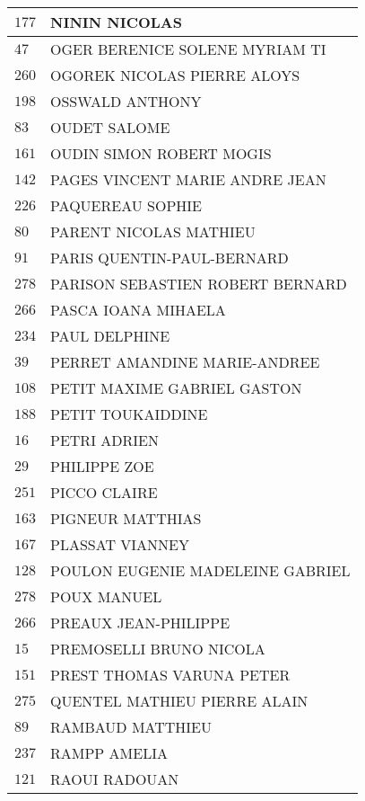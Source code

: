 \begin{xltabular}{\linewidth}{|l|X|}
    \hline
    $177$ & NININ NICOLAS \\
    \hline
    $47$ & OGER BERENICE SOLENE MYRIAM TI \\
    \hline
    $260$ & OGOREK NICOLAS PIERRE ALOYS \\
    \hline
    $198$ & OSSWALD ANTHONY \\
    \hline
    $83$ & OUDET SALOME \\
    \hline
    $161$ & OUDIN SIMON ROBERT MOGIS \\
    \hline
    $142$ & PAGES VINCENT MARIE ANDRE JEAN \\
    \hline
    $226$ & PAQUEREAU SOPHIE \\
    \hline
    $80$ & PARENT NICOLAS MATHIEU \\
    \hline
    $91$ & PARIS QUENTIN-PAUL-BERNARD \\
    \hline
    $278$ & PARISON SEBASTIEN ROBERT BERNARD \\
    \hline
    $266$ & PASCA IOANA MIHAELA \\
    \hline
    $234$ & PAUL DELPHINE \\
    \hline
    $39$ & PERRET AMANDINE MARIE-ANDREE \\
    \hline
    $108$ & PETIT MAXIME GABRIEL GASTON \\
    \hline
    $188$ & PETIT TOUKAIDDINE \\
    \hline
    $16$ & PETRI ADRIEN \\
    \hline
    $29$ & PHILIPPE ZOE \\
    \hline
    $251$ & PICCO CLAIRE \\
    \hline
    $163$ & PIGNEUR MATTHIAS \\
    \hline
    $167$ & PLASSAT VIANNEY \\
    \hline
    $128$ & POULON EUGENIE MADELEINE GABRIEL \\
    \hline
    $278$ & POUX MANUEL \\
    \hline
    $266$ & PREAUX JEAN-PHILIPPE \\
    \hline
    $15$ & PREMOSELLI BRUNO NICOLA \\
    \hline
    $151$ & PREST THOMAS VARUNA PETER \\
    \hline
    $275$ & QUENTEL MATHIEU PIERRE ALAIN \\
    \hline
    $89$ & RAMBAUD MATTHIEU \\
    \hline
    $237$ & RAMPP AMELIA \\
    \hline
    $121$ & RAOUI RADOUAN \\
    \hline

\end{xltabular}
